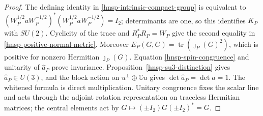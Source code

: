 \begin{proof}
The defining identity in \eqref{hnsp-intrinsic-compact-group} is equivalent to
\((W_P^{1/2}aW_P^{-1/2})^*(W_P^{1/2}aW_P^{-1/2})=I_2\); determinants are one,
so this identifies \(K_P\) with \(SU(2)\).  Cyclicity of the trace and
\(R_P^*R_P=W_P\) give the second equality in
\eqref{hnsp-positive-normal-metric}.  Moreover
\(E_P(G,G)=\operatorname{tr}(\jmath_P(G)^2)\), which is positive for nonzero
Hermitian \(\jmath_P(G)\).  Equation
\eqref{hnsp-spin-congruence} and unitarity of \(\widehat a_P\) prove
invariance.  Proposition~\ref{hnsp-su3-distinction} gives
\(\widehat a_P\in U(3)\), and the block action on
\(u^\perp\oplus\mathbb Cu\) gives
\(\det\widehat a_P=\det a=1\).  The whitened formula is direct
multiplication.  Unitary congruence fixes the scalar line and acts through the
adjoint rotation representation on traceless Hermitian matrices; the central
elements act by \(G\mapsto(\pm I_2)G(\pm I_2)^*=G\).
\end{proof}

